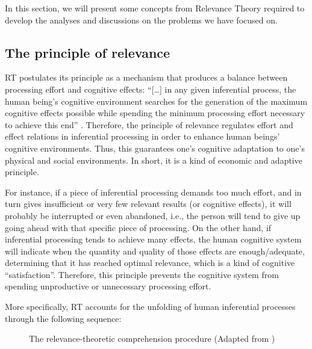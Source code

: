 \documentclass[output=paper]{langsci/langscibook}
\begin{document}
In this section, we will present some concepts from Relevance Theory required to develop the analyses and discussions on the problems we have focused on.


\subsection{The principle of relevance\label{alves:sec:ThePrincipleOfRelevance}}

RT postulates its principle as a mechanism that produces a balance between processing effort and cognitive effects: ``[\ldots] in any given inferential process, the human being's cognitive environment searches for the generation of the maximum cognitive effects possible while spending the minimum processing effort necessary to achieve this end'' \citep[109]{alves2013}. Therefore, the principle of relevance regulates effort and effect relations in inferential processing in order to enhance human beings' cognitive environments. Thus, this guarantees one's cognitive adaptation to one's physical and social environments. In short, it is a kind of economic and adaptive principle.


For instance, if a piece of inferential processing demands too much effort, and in turn gives insufficient or very few relevant results (or cognitive effects), it will probably be interrupted or even abandoned, i.e., the person will tend to give up going ahead with that specific piece of processing. On the other hand, if inferential processing tends to achieve many effects, the human cognitive system will indicate when the quantity and quality of those effects are enough/adequate, determining that it has reached optimal relevance, which is a kind of cognitive ``satisfaction''. Therefore, this principle prevents the cognitive system from spending unproductive or unnecessary processing effort.



More specifically, RT accounts for the unfolding of human inferential processes through the following sequence:


  
\begin{figure}

 \caption{The relevance-theoretic comprehension procedure (Adapted from \citealt[6]{alves2003})}
 \label{sarto:fig:1}
\end{figure} 
\end{document}
